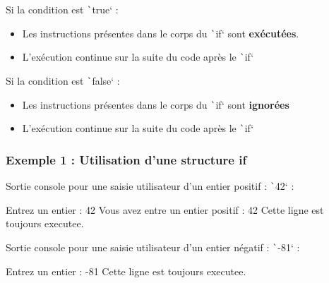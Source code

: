 \documentclass[10pt]{article}
\begin{document}
Si la condition est \texttt`true` :
\begin{itemize}
    \item Les instructions présentes dans le corps du \texttt`if` sont \textbf{exécutées}.
    \item L'exécution continue sur la suite du code après le \texttt`if` 
\end{itemize}
Si la condition est \texttt`false` :
\begin{itemize}
    \item Les instructions présentes dans le corps du \texttt`if` sont \textbf{ignorées}
    \item L'exécution continue sur la suite du code après le \texttt`if` 
\end{itemize}

\subsubsection{Exemple 1 : Utilisation d'une structure if}

\label{exempleStrucIf}

\bigskip
Sortie console pour une saisie utilisateur d'un entier positif : \texttt`42`  :

\begin{textcode}
    Entrez un entier : 42
    Vous avez entre un entier positif : 42
    Cette ligne est toujours executee.
\end{textcode}

Sortie console pour une saisie utilisateur d'un entier négatif : \texttt`-81`  :

\begin{textcode}
    Entrez un entier : -81
    Cette ligne est toujours executee.
\end{textcode}
\end{document}

